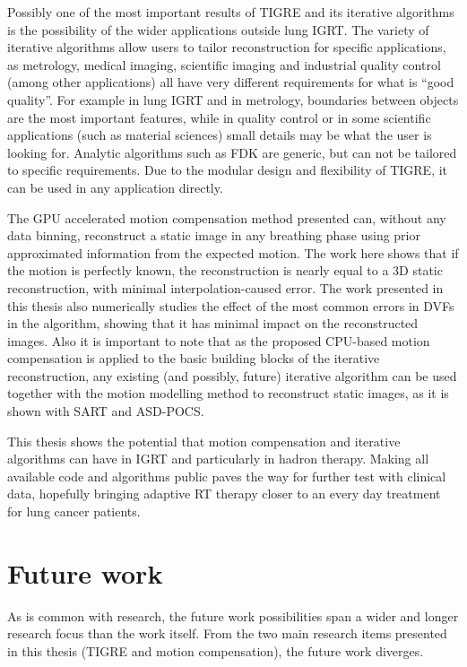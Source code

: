 Possibly one of the most important results of TIGRE and its iterative algorithms is the possibility of the wider applications outside lung IGRT. The variety of iterative algorithms allow users to tailor reconstruction for specific applications, as metrology, medical imaging, scientific imaging and industrial quality control (among other applications) all have very different requirements for what is ``good quality''. For example in lung IGRT and in metrology, boundaries between objects are the most important features, while in quality control or in some scientific applications (such as material sciences) small details may be what the user is looking for. Analytic algorithms such as FDK are generic, but can not be tailored to specific requirements. Due to the modular design and flexibility of TIGRE, it can be used in any application directly.


The GPU accelerated motion compensation method presented can, without any data binning, reconstruct a static image in any breathing phase using prior approximated information from the expected motion. The work here shows that if the motion is perfectly known, the reconstruction is nearly equal to a 3D static reconstruction, with minimal interpolation-caused error. The work presented in this thesis also numerically studies the effect of the most common errors in DVFs in the algorithm, showing that it has minimal impact on the reconstructed images. Also it is important to note that as the proposed CPU-based motion compensation is applied to the basic building blocks of the iterative reconstruction, any existing (and possibly, future) iterative algorithm can be used together with the motion modelling method to reconstruct static images, as it is shown with SART and ASD-POCS. 

This thesis shows the potential that motion compensation and iterative algorithms can have in IGRT and particularly in hadron therapy. Making all available code and algorithms public paves the way for further test with clinical data, hopefully bringing adaptive RT therapy closer to an every day treatment for lung cancer patients.


\section{Future work}

As is common with research, the future work possibilities span a wider and longer research focus than the work itself. From the two main research items presented  in this thesis (TIGRE and motion compensation), the future work diverges.

